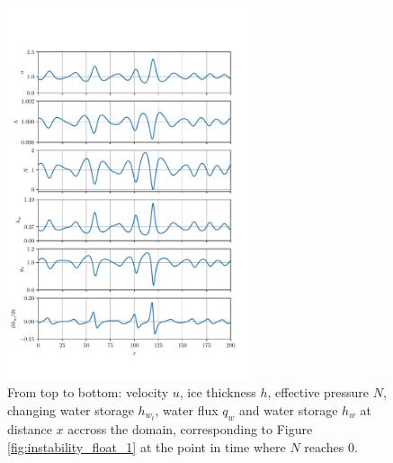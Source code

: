 \documentclass[journal abbreviation, manuscript]{copernicus}
\begin{document}
\begin{figure}[htb!]
\includegraphics[width=0.65\textwidth]{pictures/solnatfloat.pdf}
   \caption{From top to bottom: velocity $u$, ice thickness $h$, effective pressure $N$, changing water storage $h_{w_t}$, water flux $q_w$ and water storage $h_w$ at distance $x$ accross the domain, corresponding to Figure \ref{fig:instability_float_1} at the point in time where $N$ reaches $0$.}
   \label{fig:solnbreakdown}
\end{figure}
\end{document}
